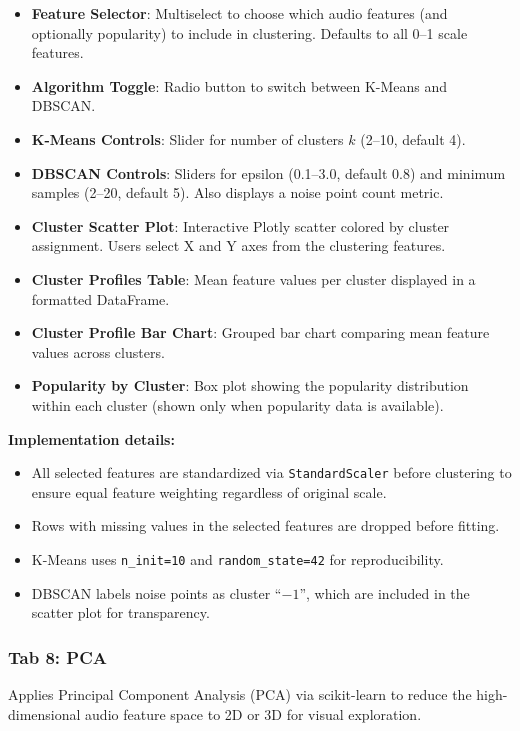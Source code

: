 \documentclass[12pt,a4paper]{article}
\begin{document}
\begin{itemize}[noitemsep]
    \item \textbf{Feature Selector}: Multiselect to choose which audio features (and optionally popularity) to include in clustering. Defaults to all 0--1 scale features.
    \item \textbf{Algorithm Toggle}: Radio button to switch between K-Means and DBSCAN.
    \item \textbf{K-Means Controls}: Slider for number of clusters $k$ (2--10, default 4).
    \item \textbf{DBSCAN Controls}: Sliders for epsilon (0.1--3.0, default 0.8) and minimum samples (2--20, default 5). Also displays a noise point count metric.
    \item \textbf{Cluster Scatter Plot}: Interactive Plotly scatter colored by cluster assignment. Users select X and Y axes from the clustering features.
    \item \textbf{Cluster Profiles Table}: Mean feature values per cluster displayed in a formatted DataFrame.
    \item \textbf{Cluster Profile Bar Chart}: Grouped bar chart comparing mean feature values across clusters.
    \item \textbf{Popularity by Cluster}: Box plot showing the popularity distribution within each cluster (shown only when popularity data is available).
\end{itemize}

\textbf{Implementation details:}
\begin{itemize}[noitemsep]
    \item All selected features are standardized via \texttt{StandardScaler} before clustering to ensure equal feature weighting regardless of original scale.
    \item Rows with missing values in the selected features are dropped before fitting.
    \item K-Means uses \texttt{n\_init=10} and \texttt{random\_state=42} for reproducibility.
    \item DBSCAN labels noise points as cluster ``$-1$'', which are included in the scatter plot for transparency.
\end{itemize}

\subsubsection{Tab 8: PCA}

Applies Principal Component Analysis (PCA) via scikit-learn to reduce the high-dimensional audio feature space to 2D or 3D for visual exploration.
\end{document}
